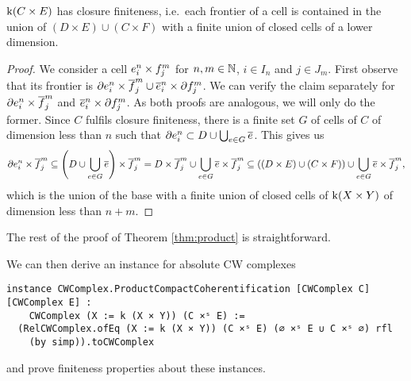 \begin{lem}
  $\kif (C \times E)$ has closure finiteness, i.e.\ each frontier of a cell is contained in the union of $(D \times E) \cup (C \times F)$ with a finite union of closed cells of a lower dimension.
\end{lem}
\begin{proof}
  We consider a cell $\openCell{n}{i} \times \openCellf{m}{j}$ for $n, m \in \bN$, $i \in I_n$ and $j \in J_m$. 
  First observe that its frontier is $\cellFrontier{n}{i} \times \closedCellf{m}{j} \cup \closedCell{n}{i} \times \cellFrontierf{m}{j}$.
  We can verify the claim separately for $\cellFrontier{n}{i} \times \closedCellf{m}{j}$ and $\closedCell{n}{i} \times \cellFrontierf{m}{j}$. 
  As both proofs are analogous, we will only do the former.
  Since $C$ fulfils closure finiteness, there is a finite set $G$ of cells of $C$ of dimension less than $n$ such that $\cellFrontier{n}{i} \subset D \cup \bigcup_{e \in G}\closure{e}$. 
  This gives us 
  \begin{equation*}
    \cellFrontier{n}{i} \times \closedCellf{m}{j} \subseteq \left( D \cup \bigcup_{e \in G}\closure{e} \right) \times \closedCellf{m}{j} = D \times \closedCellf{m}{j} \cup \bigcup_{e \in G} \closure{e} \times \closedCellf{m}{j} \subseteq ((D \times E) \cup (C \times F)) \cup \bigcup_{e \in G} \closure{e} \times \closedCellf{m}{j},
  \end{equation*}
  which is the union of the base with a finite union of closed cells of $\kif (X \times Y)$ of dimension less than $n + m$.
\end{proof}

The rest of the proof of Theorem \ref{thm:product} is straightforward. 

We can then derive an instance for absolute CW complexes 

\begin{lstlisting}[frame=single]
instance CWComplex.ProductCompactCoherentification [CWComplex C] [CWComplex E] :
    CWComplex (X := k (X × Y)) (C ×ˢ E) :=
  (RelCWComplex.ofEq (X := k (X × Y)) (C ×ˢ E) (∅ ×ˢ E ∪ C ×ˢ ∅) rfl 
    (by simp)).toCWComplex
\end{lstlisting}

and prove finiteness properties about these instances. 